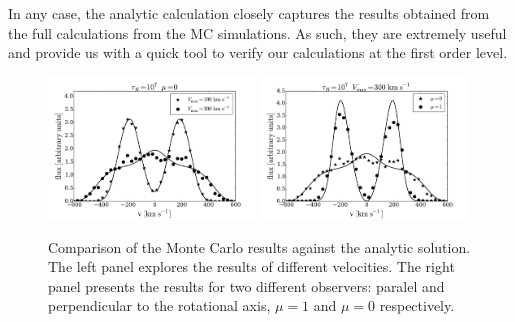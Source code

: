 In any case, the analytic calculation closely captures the results
obtained from the full calculations from the MC simulations.
As such, they are extremely useful and provide us with a quick tool to
verify our calculations at the first order level.
\begin{figure}
\begin{center}
\includegraphics[width=0.49\textwidth]{../Figures/fig10a.pdf}
\includegraphics[width=0.49\textwidth]{../Figures/fig10b.pdf}
\end{center}
\caption{
Comparison of the Monte Carlo results against the analytic
solution. The left panel explores the results of different velocities.
The right panel presents the results for two different observers:
paralel and perpendicular to the rotational axis, $\mu=1$ and $\mu=0$
respectively.
\label{fig:comparison} }
\end{figure}
